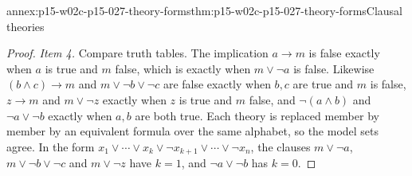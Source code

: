 \begin{annexitem}{annex:p15-w02c-p15-027-theory-forms}{thm:p15-w02c-p15-027-theory-forms}{Clausal theories}
\begin{proof}
\emph{Item 4.} Compare truth tables. The implication \(a\to m\) is false
exactly when \(a\) is true and \(m\) false, which is exactly when
\(m\lor\neg a\) is false. Likewise \((b\land c)\to m\) and
\(m\lor\neg b\lor\neg c\) are false exactly when \(b,c\) are true and \(m\)
is false, \(z\to m\) and \(m\lor\neg z\) exactly when \(z\) is true and
\(m\) false, and \(\neg(a\land b)\) and \(\neg a\lor\neg b\) exactly when
\(a,b\) are both true. Each theory is replaced member by member by an
equivalent formula over the same alphabet, so the model sets agree. In
the form \(x_1\lor\cdots\lor x_k\lor\neg x_{k+1}\lor\cdots\lor\neg x_n\),
the clauses \(m\lor\neg a\), \(m\lor\neg b\lor\neg c\) and \(m\lor\neg z\)
have \(k=1\), and \(\neg a\lor\neg b\) has \(k=0\).
\end{proof}
\end{annexitem}

